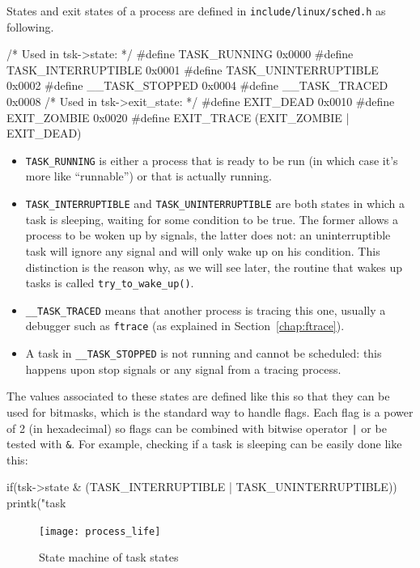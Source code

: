 States and exit states of a process are defined in \verb|include/linux/sched.h| as following.
\begin{code}
/* Used in tsk->state: */
#define TASK_RUNNING    0x0000
#define TASK_INTERRUPTIBLE  0x0001
#define TASK_UNINTERRUPTIBLE    0x0002
#define __TASK_STOPPED			0x0004
#define __TASK_TRACED			0x0008
/* Used in tsk->exit_state: */
#define EXIT_DEAD   0x0010
#define EXIT_ZOMBIE 0x0020
#define EXIT_TRACE  (EXIT_ZOMBIE | EXIT_DEAD)
\end{code}
\begin{itemize}
\item \verb|TASK_RUNNING| is either a process that is ready to be run
  (in which case it's more like ``runnable'') or that is actually
  running.

\item   \verb|TASK_INTERRUPTIBLE| and \verb|TASK_UNINTERRUPTIBLE| are both
  states in which a task is sleeping, waiting for some condition to
  be true. The former allows a process to be woken up by signals, the
  latter does not: an uninterruptible task will ignore any signal and
  will only wake up on his condition. This distinction is the reason
  why, as we will see later, the routine that wakes up tasks is called
  \verb|try_to_wake_up()|. 
\item \verb|__TASK_TRACED| means that another process is tracing this
  one, usually a debugger such as \verb|ftrace| (as explained in
  Section~\ref{chap:ftrace}).
\item A task in \verb|__TASK_STOPPED| is not running and cannot be
  scheduled: this happens upon stop signals or any signal from a
  tracing process.
\end{itemize}

The values associated to these states are defined like this so that they can be used for bitmasks, which is the standard way to handle flags. Each flag is a power of 2 (in hexadecimal) so flags can be combined with bitwise operator \verb&|& or be tested with \verb|&|. For example, checking if a task is sleeping can be easily done like this: 

\begin{code}
if(tsk->state & (TASK_INTERRUPTIBLE | TASK_UNINTERRUPTIBLE))
    printk("task %
\end{code}

\begin{figure}[ht]
  \centering
  \texttt{[image: process\_life]} %
  \caption{State machine of task states}
  \label{img:process_life}
\end{figure}

